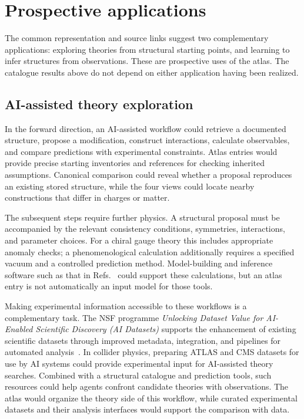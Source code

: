 \section{Prospective applications}
\label{sec:applications}

The common representation and source links suggest two complementary applications: exploring theories from structural starting points, and learning to infer structures from observations. These are prospective uses of the atlas. The catalogue results above do not depend on either application having been realized.

\subsection{AI-assisted theory exploration}

In the forward direction, an AI-assisted workflow could retrieve a documented structure, propose a modification, construct interactions, calculate observables, and compare predictions with experimental constraints. Atlas entries would provide precise starting inventories and references for checking inherited assumptions. Canonical comparison could reveal whether a proposal reproduces an existing stored structure, while the four views could locate nearby constructions that differ in charges or matter.

The subsequent steps require further physics. A structural proposal must be accompanied by the relevant consistency conditions, symmetries, interactions, and parameter choices. For a chiral gauge theory this includes appropriate anomaly checks; a phenomenological calculation additionally requires a specified vacuum and a controlled prediction method. Model-building and inference software such as that in Refs.~\cite{FeynRules,SARAH,GAMBIT} could support these calculations, but an atlas entry is not automatically an input model for those tools.

Making experimental information accessible to these workflows is a complementary task. The NSF programme \emph{Unlocking Dataset Value for AI-Enabled Scientific Discovery (AI Datasets)} supports the enhancement of existing scientific datasets through improved metadata, integration, and pipelines for automated analysis~\cite{NSFAIDatasets}. In collider physics, preparing ATLAS and CMS datasets for use by AI systems could provide experimental input for AI-assisted theory searches. Combined with a structural catalogue and prediction tools, such resources could help agents confront candidate theories with observations. The atlas would organize the theory side of this workflow, while curated experimental datasets and their analysis interfaces would support the comparison with data.

